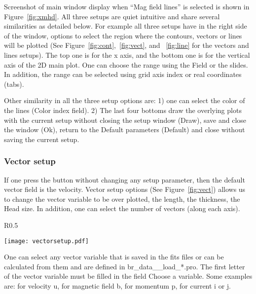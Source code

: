 \documentclass[12pt,preprint]{aastex}
\begin{document}
Screenshot of main window display when ``Mag field lines'' is selected is shown in 
Figure~\ref{fig:xmhd}. All three setups are quiet intuitive and share several similarities
as detailed below. For example all three setups have in the right side of the window, 
options to select the region where the contours, vectors or lines will be plotted (See 
Figure~\ref{fig:cont},~\ref{fig:vect}, and ~\ref{fig:line} for the vectors and lines setups). 
The top one is for the x axis, and the bottom one is for the vertical axis of the 2D main 
plot. One can choose the range using the Field or the slides. In addition, the range
can be selected using grid axis index or real coordinates (tabs). 

Other similarity in all the three setup options are: 1) one can select the color of the 
lines (Color index field). 2) The last four bottoms draw the overlying plots with the current 
setup without closing the setup window (Draw), save and close the window (Ok), 
return to the Default parameters (Default) and close without saving the current setup. 

\subsubsection{Vector setup}

If one press the button without changing any setup parameter, then the default vector field 
is the velocity. Vector setup options (See Figure~\ref{fig:vect}) allows us to change the 
vector variable to be over plotted, the length, the thickness, the Head size. In addition, 
one can select the number of vectors (along each axis).

\begin{wrapfigure}{R}{0.5\textwidth}
\vspace{-1.cm}
\begin{center}
	\texttt{[image: vectorsetup.pdf]}
\end{center}
\vspace{-0.56cm}
\caption{\label{fig:vect} Screenshot of the Vectors setup.}
\vspace{-1.1cm}
\end{wrapfigure}


One can select any vector variable that is saved in the fits files or can be calculated from 
them and are defined in br\_data\_\_load\_*.pro. The first letter of the vector variable must
be filled in the field Choose a variable. Some examples are: for velocity u, for magnetic
field b, for momentum p, for current i or j. 
\end{document}
